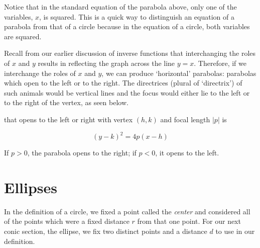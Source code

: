 \documentclass[nooutcomes]{ximera}
\begin{document}
Notice that in the standard equation of the parabola above, only one of the variables, $x$, is squared. This is a quick way to distinguish an equation of a parabola from that of a circle because in the equation of a circle, both variables are squared.

Recall from our earlier discussion of inverse functions that interchanging the roles of $x$ and $y$ results in reflecting the graph across the line $y = x$. Therefore, if we interchange the roles of $x$ and $y$, we can produce `horizontal' parabolas: parabolas which open to the left or to the right. The directrices (plural of `directrix') of such animals would be vertical lines and the focus would either lie to the left or to the right of the vertex, as seen below.

\begin{image}
\end{image}

\begin{definition}
  that opens to the left or right with vertex $(h,k)$ and focal length $|p|$ is

\[ (y-k)^2 = 4p(x-h) \]

If $p>0$, the parabola opens to the right;  if $p < 0$, it opens to the left.
\end{definition}

\section{Ellipses}
In the definition of a circle, we fixed a point called the \emph{center} and considered all of the points which were a fixed distance $r$ from that one point.  For our next conic section, the ellipse, we fix two distinct points and a distance $d$ to use in our definition.  
\end{document}

